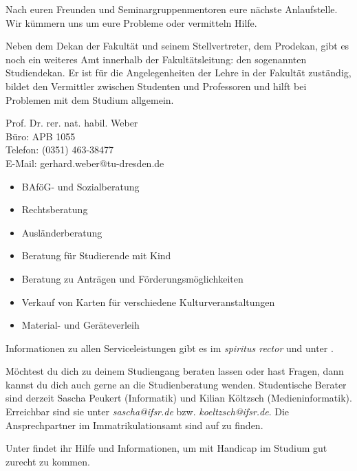 
Nach euren Freunden und Seminargruppenmentoren eure nächste Anlaufstelle.
Wir kümmern uns um eure Probleme oder vermitteln Hilfe.

Neben dem Dekan der Fakultät und seinem Stellvertreter, dem Prodekan, gibt es noch ein weiteres Amt innerhalb der Fakultätsleitung:
den sogenannten Studiendekan.
Er ist für die Angelegenheiten der Lehre in der Fakultät zuständig, bildet den Vermittler zwischen Studenten und Professoren und hilft bei Problemen mit dem Studium allgemein.

Prof. Dr. rer. nat. habil. Weber \\
Büro: APB 1055 \\
Telefon: (0351) 463-38477 \\
E-Mail: gerhard.weber@tu-dresden.de \\

\begin{itemize}
\item BAföG- und Sozialberatung
\item Rechtsberatung
\item Ausländerberatung
\item Beratung für Studierende mit Kind
\item Beratung zu Anträgen und Förderungsmöglichkeiten
\item Verkauf von Karten für verschiedene Kulturveranstaltungen
\item Material- und Geräteverleih
\end{itemize}

Informationen zu allen Serviceleistungen gibt es im \textit{spiritus rector} und unter .

Möchtest du dich zu deinem Studiengang beraten lassen oder hast Fragen, dann kannst du dich auch gerne an die Studienberatung wenden.
Studentische Berater sind derzeit Sascha Peukert (Informatik) und Kilian Költzsch (Medieninformatik).
Erreichbar sind sie unter \textit{sascha@ifsr.de} bzw. \textit{koeltzsch@ifsr.de}.
Die Ansprechpartner im Immatrikulationsamt sind auf  zu finden.

Unter  findet ihr Hilfe und Informationen, um mit Handicap im Studium gut zurecht zu kommen.

